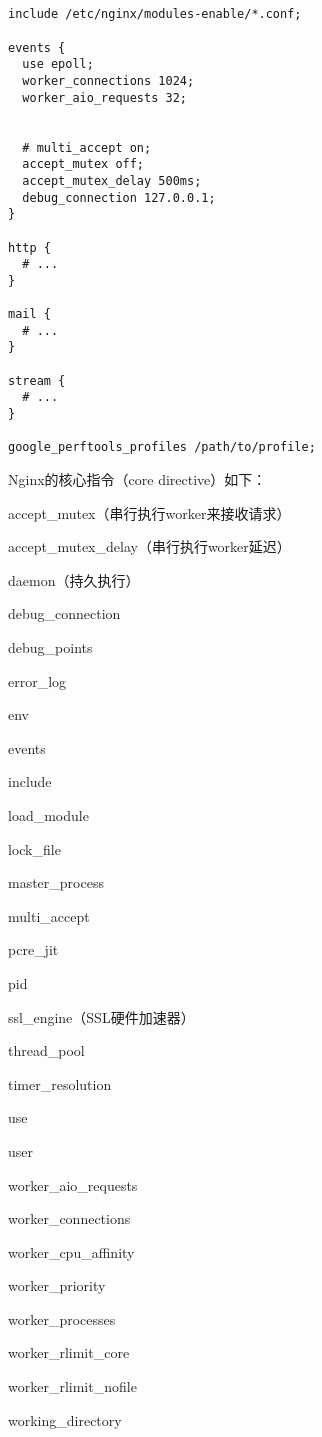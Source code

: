 \begin{lstlisting}
                                                                                                                                                                                                                                                                                                                                                                                                                                                                                                 

include /etc/nginx/modules-enable/*.conf;

events {
  use epoll;
  worker_connections 1024;
  worker_aio_requests 32;
  
  
  # multi_accept on;
  accept_mutex off;
  accept_mutex_delay 500ms;
  debug_connection 127.0.0.1;
}

http {
  # ...
}

mail {
  # ...
}

stream {
  # ...
}

google_perftools_profiles /path/to/profile;
\end{lstlisting}

Nginx的核心指令（core directive）如下：

\begin{compactitem}
\item accept\_mutex（串行执行worker来接收请求）
\item accept\_mutex\_delay（串行执行worker延迟）
\item daemon（持久执行）
\item debug\_connection
\item debug\_points
\item error\_log
\item env
\item events
\item include
\item load\_module
\item lock\_file
\item master\_process
\item multi\_accept
\item pcre\_jit
\item pid
\item ssl\_engine（SSL硬件加速器）
\item thread\_pool
\item timer\_resolution
\item use
\item user
\item worker\_aio\_requests
\item worker\_connections
\item worker\_cpu\_affinity
\item worker\_priority
\item worker\_processes
\item worker\_rlimit\_core
\item worker\_rlimit\_nofile
\item working\_directory
\end{compactitem}



